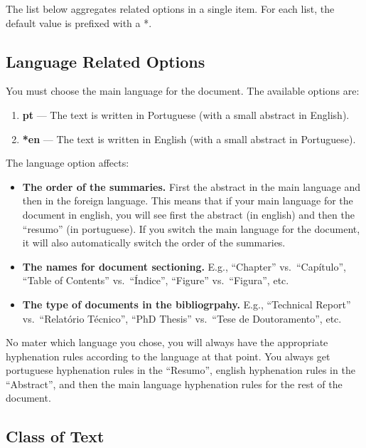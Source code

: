 The list below aggregates related options in a single item. For each list, the default value is prefixed with a *.

\subsection{Language Related Options} %
\label{sub:language_related_options}

You must choose the main language for the document. The available options are:

\begin{enumerate}
	\item \textbf{pt} --- The text is written in Portuguese (with a small abstract in English).
	\item \textbf{*en} --- The text is written in English (with a small abstract in Portuguese).
\end{enumerate}

The language option affects:
\begin{itemize}
	\item \textbf{The order of the summaries.} First the abstract in the main language and then in the foreign language. This means that if your main language for the document in english, you will see first the abstract (in english) and then the ``resumo'' (in portuguese). If you switch the main language for the document, it will also automatically switch the order of the summaries.
	\item \textbf{The names for document sectioning.} E.g., ``Chapter'' vs.\ ``Capítulo'', ``Table of Contents'' vs.\ ``Índice'', ``Figure'' vs.\ ``Figura'', etc.
	\item \textbf{The type of documents in the bibliogrpahy.} E.g., ``Technical Report'' vs.\ ``Relatório Técnico'', ``PhD Thesis'' vs.\ ``Tese de Doutoramento'', etc.
\end{itemize} 

No mater which language you chose, you will always have the appropriate hyphenation rules according to the language at that point. You always get portuguese hyphenation rules in the ``Resumo'', english hyphenation rules in the ``Abstract'', and then the main language hyphenation rules for the rest of the document.

\subsection{Class of Text} %
\label{sub:class_of_text}

